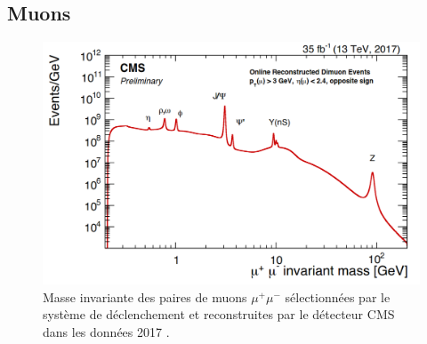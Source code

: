 \subsection{Muons}
\label{MuonID}

\begin{figure}[]
\centering
    \includegraphics[width=0.8\linewidth]{Chapitre4/Images/dimuon.png} 
    \caption{Masse invariante des paires de muons $\mu^+\mu^-$ sélectionnées par le système de déclenchement et reconstruites par le détecteur CMS dans les données 2017 \cite{Dimuon}.}
    \label{dimuon}
\end{figure} 

